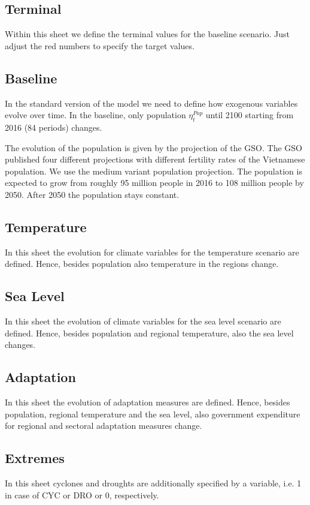 \documentclass[10pt,a4paper]{article}
\begin{document}
\subsection{Terminal}
Within this sheet we define the terminal values for the baseline scenario. Just adjust the red numbers to specify the target values.
 
\subsection{Baseline} 
In the standard version of the model we need to define how exogenous variables evolve over time. In the baseline, only population $\eta^{Pop}_{t}$ until 2100 starting from 2016 (84 periods) changes.

The evolution of the population is given by the projection of the GSO. The GSO published four different projections with different fertility rates of the Vietnamese population. We use the medium  variant population projection. The population is expected to grow from roughly 95 million people in  2016 to 108 million people by 2050. After 2050 the population stays constant.

\subsection{Temperature}
In this sheet the evolution for climate variables for the temperature scenario are defined. Hence, besides population also temperature in the regions change.
 
\subsection{Sea Level}
In this sheet the evolution of climate variables for the sea level scenario are defined. Hence, besides population and regional temperature, also the sea level changes.
 
\subsection{Adaptation}
In this sheet the evolution of adaptation measures are defined. Hence, besides population, regional temperature and the sea level, also government expenditure for regional and sectoral adaptation measures change.
  
  
\subsection{Extremes}
In this sheet cyclones and droughts are additionally specified by a variable, i.e. 1 in case of CYC or DRO or 0, respectively.
    
\end{document}
